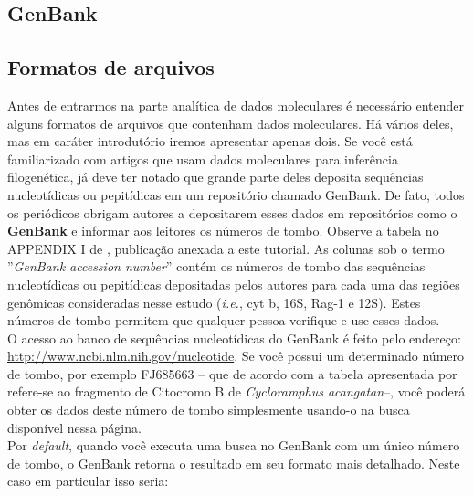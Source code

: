 \newpage
\pagestyle{fancy} %
\begin{refsection}
\renewcommand*{\finalnamedelim}{\addspace\&\space}%

\section{GenBank}\label{tut7:genbank}
\subsection{Formatos de arquivos}\label{tut7:genbank:format}

Antes de entrarmos na parte analítica de dados moleculares é necessário entender alguns formatos de arquivos que contenham dados moleculares. Há vários deles, mas em caráter introdutório iremos apresentar apenas dois. Se você está familiarizado com artigos que usam dados moleculares para inferência filogenética, já deve ter notado que grande parte deles deposita sequências nucleotídicas ou pepitídicas em um repositório chamado GenBank. De fato, todos os periódicos obrigam autores a depositarem esses dados em repositórios como o \textbf{GenBank} e informar aos leitores os números de tombo. Observe a tabela no APPENDIX I de \textcite{dias_et_al_2013}, publicação anexada a este tutorial. As colunas sob o termo ''\textit{GenBank accession number}'' contém os números de tombo das sequências nucleotídicas ou pepitídicas depositadas pelos autores para cada uma das regiões genômicas consideradas nesse estudo (\textit{i.e.}, cyt b, 16S, Rag-1 e 12S). Estes números de tombo permitem que qualquer pessoa verifique e use esses dados.\\

O acesso ao banco de sequências nucleotídicas do GenBank é feito pelo endereço: \url{http://www.ncbi.nlm.nih.gov/nucleotide}. Se você possui um determinado número de tombo, por exemplo FJ685663 -- que de acordo com a tabela apresentada por \textcite{dias_et_al_2013} refere-se ao fragmento de Citocromo B de \textit{Cycloramphus acangatan}--, você poderá obter os dados deste número de tombo simplesmente usando-o na busca disponível nessa página.\\

Por \textit{default}, quando você executa uma busca no GenBank com um único número de tombo, o GenBank retorna o resultado em seu formato mais detalhado. Neste caso em particular isso seria:\\


\end{refsection}
